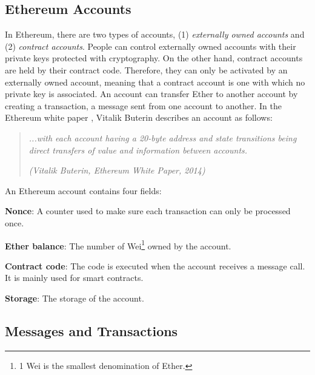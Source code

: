 

\subsection{Ethereum Accounts}

In Ethereum, there are two types of accounts, (1) \textit{externally owned accounts} and (2) \textit{contract accounts}. People can control externally owned accounts with their 
private keys protected with cryptography. On the other hand, contract accounts are held by their contract code. Therefore, they can only be activated by
an externally owned account, meaning that a contract account is one with which no private key is associated.
An account can transfer Ether to another account by creating a transaction, a message sent from one account to another.
In the Ethereum white paper \cite{ethereum_white_paper}, Vitalik Buterin describes an account as follows:

\begin{quote}
    \textit{...with each account having a 20-byte address and state transitions being direct transfers of value and information between
        accounts.}


    \textit{(Vitalik Buterin, Ethereum White Paper, 2014)}
\end{quote}

An Ethereum account contains four fields:

\begin{list}{-}{}
   \item \textbf{Nonce}: A counter used to make sure each transaction can only be processed once.
   \item  \textbf{Ether balance}: The number of Wei\footnote{1 Wei is the smallest denomination of Ether.} owned by the account.
   \item \textbf{Contract code}: The code is executed when the account receives a message call. It is mainly used for smart contracts.
   \item \textbf{Storage}: The storage of the account.
\end{list}



\subsection{Messages and Transactions}
\label{subsec:messages_and_transactions}

